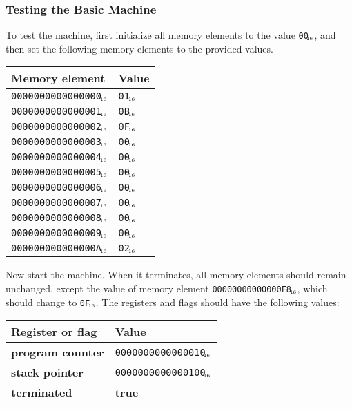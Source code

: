 \documentclass[a4paper,11pt]{article}
\newcommand{\PC}{\textbf{program counter}\xspace}
\newcommand{\SP}{\textbf{stack pointer}\xspace}
\newcommand{\TERM}{\textbf{terminated}\xspace}
\newcommand{\T}{\textbf{true}\xspace}
\newcommand{\num}[1]{\texttt{#1}\xspace}
\newcommand{\hex}[1]{\num{#1}$_{\textup{\tiny\hskip-1ex 16}}$\xspace}
\begin{document}
\subsubsection{Testing the Basic Machine}

To test the machine, first initialize all memory elements to the value \hex{00}, and then set the following memory elements to the provided values.

\begin{center}
  \begin{tabular}{@{}ll@{}}
    \hline
    Memory element         & Value \\
    \hline
    \hex{0000000000000000} & \hex{01} \\
    \hex{0000000000000001} & \hex{0B} \\
    \hex{0000000000000002} & \hex{0F} \\
    \hex{0000000000000003} & \hex{00} \\
    \hex{0000000000000004} & \hex{00} \\
    \hex{0000000000000005} & \hex{00} \\
    \hex{0000000000000006} & \hex{00} \\
    \hex{0000000000000007} & \hex{00} \\
    \hex{0000000000000008} & \hex{00} \\
    \hex{0000000000000009} & \hex{00} \\
    \hex{000000000000000A} & \hex{02} \\
    \hline
  \end{tabular}
\end{center}

Now start the machine.
When it terminates, all memory elements should remain unchanged, except the value of memory element \hex{00000000000000F8}, which should change to \hex{0F}.
The registers and flags should have the following values:

\begin{center}
  \begin{tabular}{@{}ll@{}}
    \hline
    Register or flag & Value                   \\
    \hline
    \PC              & \hex{0000000000000010}  \\
    \SP              & \hex{0000000000000100}  \\
    \TERM            & \T                      \\
    \hline
  \end{tabular}
\end{center}
\end{document}
